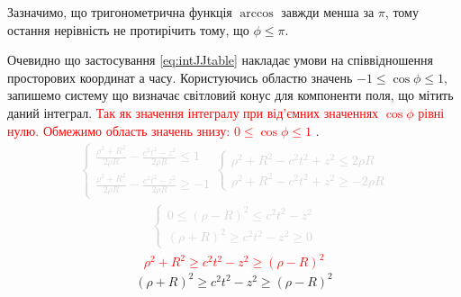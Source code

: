 Зазначимо, що тригонометрична функція $ \arccos $ завжди менша за $ \pi $,
тому остання нерівність не протирічить тому, що $ \phi \leq \pi $.

Очевидно що застосування \eqref{eq:intJJtable} накладає умови на співвідношення
просторових координат а часу. Користуючись областю значень 
$ -1 \leq \cos \phi \leq 1 $, запишемо систему що визначає світловий конус 
\cite[ст. 22]{LandauII} для компоненти поля, що мітить даний інтеграл. 
\textcolor{red}{ Так як значення інтегралу при від'ємних значеннях $ \cos \phi $ 
рівні нулю. Обмежимо область значень знизу: $ 0 \leq \cos \phi \leq 1 $ }. 
%
\textcolor{lightgray}{ \begin{equation*} \begin{aligned}
\begin{cases}
\frac{\rho^2 + R^2}{2 \rho R} - \frac{c^2 t^2 - z^2}{2 \rho R} \leq 1 \\
\frac{\rho^2 + R^2}{2 \rho R} - \frac{c^2 t^2 - z^2}{2 \rho R} \geq - 1
\end{cases}
\begin{cases}
\rho^2 + R^2 - c^2 t^2 + z^2 \leq 2 \rho R \\
\rho^2 + R^2 - c^2 t^2 + z^2 \geq - 2 \rho R
\end{cases} 
\end{aligned} \end{equation*} }
%
\textcolor{lightgray}{ \begin{equation*} \begin{aligned}
\begin{cases}
0 \leq \left( \rho - R \right)^2 \leq c^2 t^2 - z^2 \\ 
\left( \rho + R \right)^2 \geq c^2 t^2 - z^2 \geq 0
\end{cases} 
\end{aligned} \end{equation*} }
%
\textcolor{red}{ \begin{equation*} \begin{aligned}
\rho^2 + R^2 \geq c^2 t^2 - z^2 \geq \left( \rho - R \right)^2
\end{aligned}  \end{equation*} }
%
\begin{equation*}
\left( \rho + R \right)^2 \geq c^2 t^2 - z^2 \geq \left( \rho - R \right)^2
\end{equation*}
%
